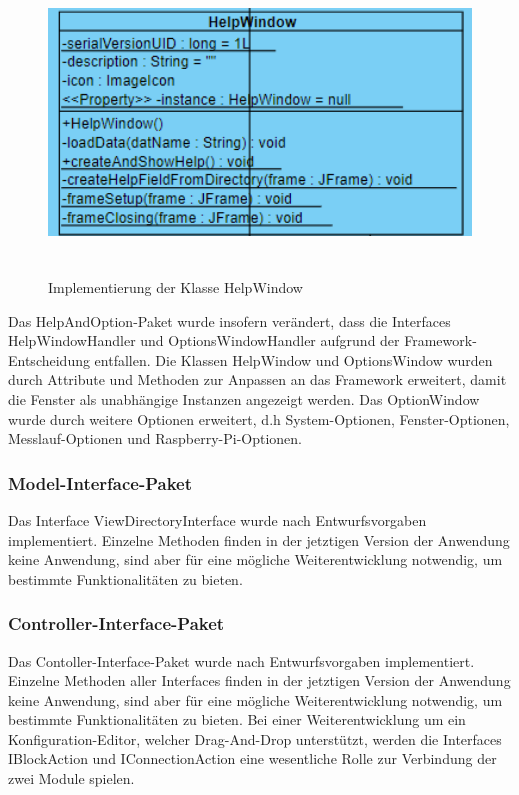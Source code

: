 \documentclass[parskip=full]{scrartcl}
\begin{document}
\begin{figure}[htbp]
    \begin{center}
        \includegraphics[height = 8cm]{Grafiken/HelpWindow.png}
        \caption{Implementierung der Klasse HelpWindow}
        \label{help}
    \end{center}
\end{figure}


Das HelpAndOption-Paket wurde insofern verändert, dass die Interfaces HelpWindowHandler und OptionsWindowHandler aufgrund der Framework-Entscheidung entfallen.
Die Klassen HelpWindow und OptionsWindow wurden durch Attribute und Methoden zur Anpassen an das Framework erweitert, damit die Fenster als unabhängige Instanzen angezeigt werden. Das OptionWindow wurde durch weitere Optionen erweitert, d.h System-Optionen, Fenster-Optionen, Messlauf-Optionen und Raspberry-Pi-Optionen.

\subsubsection{Model-Interface-Paket}

Das Interface ViewDirectoryInterface wurde nach Entwurfsvorgaben implementiert. Einzelne Methoden finden in der jetztigen Version der Anwendung keine Anwendung, sind aber für eine mögliche Weiterentwicklung notwendig, um bestimmte Funktionalitäten zu bieten.

\subsubsection{Controller-Interface-Paket}

Das Contoller-Interface-Paket wurde nach Entwurfsvorgaben implementiert. Einzelne Methoden aller Interfaces finden in der jetztigen Version der Anwendung keine Anwendung, sind aber für eine mögliche Weiterentwicklung notwendig, um bestimmte Funktionalitäten zu bieten. Bei einer Weiterentwicklung um ein Konfiguration-Editor, welcher Drag-And-Drop unterstützt, werden die Interfaces IBlockAction und IConnectionAction eine wesentliche Rolle zur Verbindung der zwei Module spielen.
\end{document}
